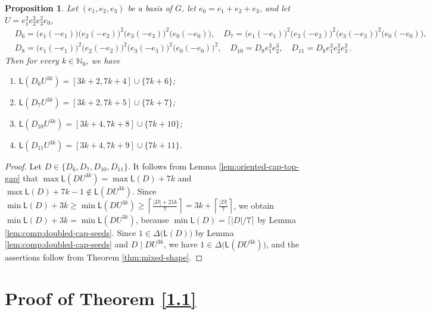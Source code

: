 \documentclass[a4paper, 10pt]{amsart}
\theoremstyle{plain}
\newtheorem{proposition}[theorem]{\bf Proposition}
\theoremstyle{definition}
\theoremstyle{definition}
\newcommand{\N}{\mathbb N}
\numberwithin{equation}{section}
\begin{document}
\begin{proposition}\label{P-D}
Let $(e_1,e_2,e_3)$ be a basis of $G$,  let $e_0=e_1+e_2+e_3$, and let $U=e_1^2e_2^2e_3^2e_0$,  
	\begin{align*}
	&	D_6= \big(e_1(-e_1) \big) \big(e_2(-e_2) \big)^2 \big(e_3(-e_3) \big)^2 \big(e_0(-e_0) \big), \quad
	D_7= \big(e_1(-e_1) \big)^2 \big(e_2(-e_2) \big)^2 \big(e_3(-e_3) \big)^2 \big(e_0(-e_0) \big),\\
	& D_8= \big(e_1(-e_1) \big)^2 \big(e_2(-e_2) \big)^2 \big(e_3(-e_3) \big)^2 \big(e_0(-e_0) \big)^2, \quad 
	D_{10}=D_8e_1^3e_2^3, \quad
	D_{11}=D_8e_1^3e_2^3e_3^3\,.
	\end{align*}
Then for every $k\in \N_0$, we have
\begin{enumerate}
	\item $\mathsf L(D_6U^{3k})=[3k+2, 7k+4]\cup \{7k+6\}$;
	\item $\mathsf L(D_7U^{3k})=[3k+2, 7k+5]\cup \{7k+7\}$;
	\item $\mathsf L(D_{10}U^{3k})=[3k+4, 7k+8]\cup \{7k+10\}$;
	\item $\mathsf L(D_{11}U^{3k})=[3k+4, 7k+9]\cup \{7k+11\}$.
\end{enumerate}
\end{proposition}

\begin{proof}
Let $D\in \{D_6,D_7, D_{10}, D_{11}\}$. It follows from Lemma \ref{lem:oriented-cap-top-gap} that $\max\mathsf L(DU^{3k})=\max\mathsf L(D)+7k$ and $\max\mathsf L(D)+7k-1\not\in \mathsf L(DU^{3k})$.
Since $\min \mathsf L(D)+3k\ge \min \mathsf L(DU^{3k})\ge \left\lceil \frac{|D|+21k}{7}\right\rceil =3k+\left\lceil \frac{|D|}{7}\right\rceil$,
we obtain $\min \mathsf L(D)+3k=\min \mathsf L(DU^{3k})$, because
$\min \mathsf L(D) = \lceil |D|/7 \rceil$ by Lemma \ref{lem:comp:doubled-cap-seeds}.
Since $1 \in \Delta \big(\mathsf L(D) \big)$ by Lemma \ref{lem:comp:doubled-cap-seeds}
and $D \mid DU^{3k}$, we have $1 \in \Delta \big(\mathsf L(DU^{3k}) \big)$, and the
assertions follow from Theorem \ref{thm:mixed-shape}.
\end{proof}


\newpage
\section{Proof of Theorem \ref{1.1}} \label{6}
\smallskip
\end{document}
